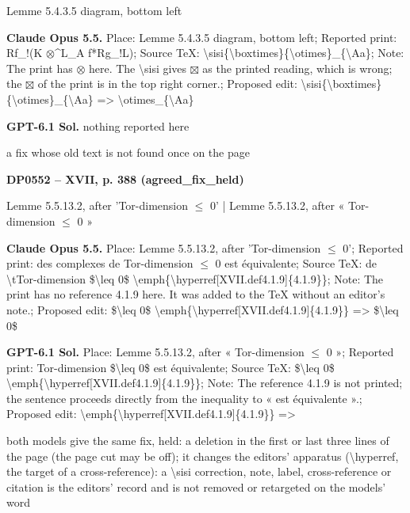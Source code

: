 Lemme 5.4.3.5 diagram, bottom left\par
\textbf{Claude Opus 5.5.} Place: Lemme 5.4.3.5 diagram, bottom left; Reported print: Rf\_!(K \ensuremath{\otimes}\textasciicircum{}L\_A f*Rg\_!L); Source TeX: \textbackslash{}sisi\{\textbackslash{}boxtimes\}\{\textbackslash{}otimes\}\_\{\textbackslash{}Aa\}; Note: The print has \ensuremath{\otimes} here. The \textbackslash{}sisi gives \ensuremath{\boxtimes} as the printed reading, which is wrong; the \ensuremath{\boxtimes} of the print is in the top right corner.; Proposed edit: \textbackslash{}sisi\{\textbackslash{}boxtimes\}\{\textbackslash{}otimes\}\_\{\textbackslash{}Aa\} =\allowbreak > \textbackslash{}otimes\_\{\textbackslash{}Aa\}\par
\textbf{GPT-6.1 Sol.} nothing reported here\par
a fix whose old text is not found once on the page\par
\par\noindent\hypertarget{DP0552}{}\textbf{DP0552 -- XVII, p. 388 (agreed\_fix\_held)}\par
Lemme 5.5.13.2, after 'Tor-dimension \ensuremath{\leq} 0' | Lemme 5.5.13.2, after « Tor-dimension \ensuremath{\leq} 0 »\par
\textbf{Claude Opus 5.5.} Place: Lemme 5.5.13.2, after 'Tor-dimension \ensuremath{\leq} 0'; Reported print: des complexes de Tor-dimension \ensuremath{\leq} 0 est équivalente; Source TeX: de \textbackslash{}tTor-dimension \$\textbackslash{}leq 0\$ \textbackslash{}emph\{\textbackslash{}hyperref[XVII.def4.1.9]\{4.1.9\}\}; Note: The print has no reference 4.1.9 here. It was added to the TeX without an editor's note.; Proposed edit:  \$\textbackslash{}leq 0\$ \textbackslash{}emph\{\textbackslash{}hyperref[XVII.def4.1.9]\{4.1.9\}\} =\allowbreak >  \$\textbackslash{}leq 0\$\par
\textbf{GPT-6.1 Sol.} Place: Lemme 5.5.13.2, after « Tor-dimension \ensuremath{\leq} 0 »; Reported print: Tor-dimension \$\textbackslash{}leq 0\$ est équivalente; Source TeX: \$\textbackslash{}leq 0\$ \textbackslash{}emph\{\textbackslash{}hyperref[XVII.def4.1.9]\{4.1.9\}\}; Note: The reference 4.1.9 is not printed; the sentence proceeds directly from the inequality to « est équivalente ».; Proposed edit:  \textbackslash{}emph\{\textbackslash{}hyperref[XVII.def4.1.9]\{4.1.9\}\} =\allowbreak > \par
both models give the same fix, held: a deletion in the first or last three lines of the page (the page cut may be off); it changes the editors' apparatus (\textbackslash{}hyperref, the target of a cross-reference): a \textbackslash{}sisi correction, note, label, cross-reference or citation is the editors' record and is not removed or retargeted on the models' word\par

